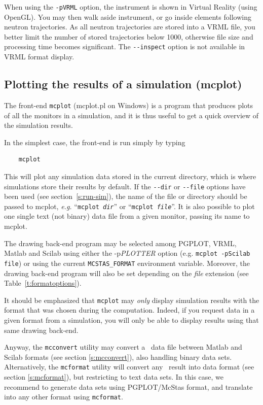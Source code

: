 When using the \verb+-pVRML+ option, the instrument is shown in Virtual Reality (using OpenGL). You may then walk aside instrument, or go inside elements following neutron trajectories. As all neutron trajectories are stored into a VRML file, you better limit the number of stored trajectories below 1000, otherwise file size and processing time becomes significant. The \verb+--inspect+ option is not available in VRML format display.

\subsection{Plotting the results of a simulation (mcplot)}
\label{s:mcplot}

The front-end \verb+mcplot+ (mcplot.pl on Windows) is a program that produces
plots of all the monitors in a simulation, and it is thus useful to get
a quick overview of the simulation results.

In the simplest case, the front-end is run simply by typing
\begin{verbatim}
    mcplot
\end{verbatim}
This will plot any simulation data stored in the current directory,
which is where simulations store their results by default. If the
\verb+--dir+ or \verb+--file+ options have been used (see
section~\ref{s:run-sim}), the name of the file or directory should be
passed to mcplot, {\em e.g.} ``\texttt{mcplot {\it dir}}'' or ``\texttt{mcplot
  {\it file}}''.
It is also possible to plot one single text (not binary) data file from a given monitor, passing its name to mcplot.

The drawing back-end program may be selected among PGPLOT, VRML, Matlab and Scilab using either the -p{\it PLOTTER} option (e.g. \verb+mcplot -pScilab file+) or using the current \verb+MCSTAS_FORMAT+ environment variable.  Moreover, the drawing back-end program will also be set depending on the {\it file} extension (see Table~\ref{t:formatoptions}).

It should be emphasized that \verb+mcplot+ may \emph{only} display simulation results with the format that was chosen during the computation. Indeed, if you request data in a given format from a simulation, you will only be able to display results using that same drawing back-end.

Anyway, the \verb+mcconvert+ utility may convert a \MCS\ data file between Matlab and Scilab formats (see section \ref{s:mcconvert}), also handling binary data sets. Alternatively, the \verb+mcformat+ utility will convert any \MCS\ result into data format (see section \ref{s:mcformat}), but restricting to text data sets. In this case, we recommend to generate data sets using PGPLOT/McStas format, and translate into any other format using \verb+mcformat+.

